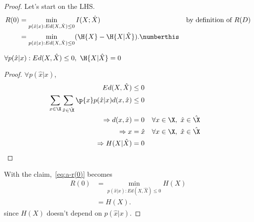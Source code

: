 \documentclass[
  coursecode={MTHE 477},
  assignmentname={Homework \homeworknumber},
  studentnumber=20053722,
  name={Bryan Hoang},
  draft,
]{
  ltxanswer%
}
\begin{document}
  \begin{questions}
    \setcounter{question}{\questionnumber}
    \addtocounter{question}{-1}
    \question[25]\
    \begin{parts}
      \part{}
      \begin{solution}
        \begin{proof}
          Let's start on the LHS.
          \begin{align*}
            R(0) &= \min_{p(\hat{x}|x) : Ed(X,\hat{X}) \le 0} I(X;\hat{X})                                         & &\text{by definition of \(R(D)\)} \\
                 &= \min_{p(\hat{x}|x) : Ed(X,\hat{X}) \le 0} (\H{X} - \H{X|\hat{X}}).\numberthis\label{eq:a-r(0)}
          \end{align*}
          \begin{claim}
            \(\forall p(\hat{x} | x) : Ed(X, \hat{X}) \le 0,\ \H{X|\hat{X}} = 0\)
          \end{claim}
          \begin{proof}
            \(\forall p(\hat{x} | x)\),
            \begin{align*}
              Ed(X, \hat{X})                                                         &\le 0                                            \\
              \sum_{x\in\X}\sum_{\hat{x}\in\hat{\X}} \p{x} p(\hat{x}|x) d(x,\hat{x}) &\le 0                                            \\
              \Rightarrow d(x,\hat{x})                                               &= 0       & &\forall x\in\X,\ \hat{x}\in\hat{\X} \\
              \Rightarrow x                                                          &= \hat{x} & &\forall x\in\X,\ \hat{x}\in\hat{\X} \\
              \Rightarrow H(X|\hat{X})                                               &= 0
            \end{align*}
          \end{proof}
          With the claim,~\eqref{eq:a-r(0)} becomes
          \begin{align*}
            R(0) &= \min_{p(\hat{x}|x) : Ed(X,\hat{X}) \le 0} H(X) \\
                 &= H(X).
          \end{align*}
          since \(H(X)\) doesn't depend on \(p(\hat{x}|x)\).
        \end{proof}
      \end{solution}


\end{parts}
\end{questions}
\end{document}
